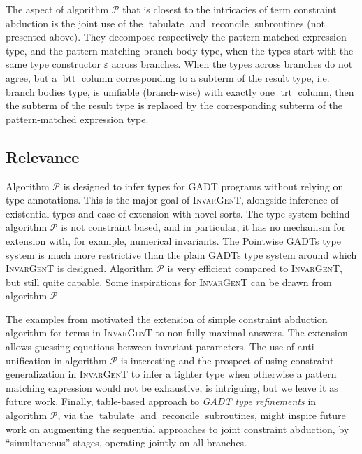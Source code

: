 \documentclass{article}
\newcommand{\tmem}[1]{{\em #1\/}}
\newcommand{\tmname}[1]{\textsc{#1}}
\newcommand{\tmop}[1]{\ensuremath{\operatorname{#1}}}
\begin{document}
The aspect of algorithm $\mathcal{P}$ that is closest to the intricacies of
term constraint abduction is the joint use of the $\tmop{tabulate}$ and
$\tmop{reconcile}$ subroutines (not presented above). They decompose
respectively the pattern-matched expression type, and the pattern-matching
branch body type, when the types start with the same type constructor
$\varepsilon$ across branches. When the types across branches do not agree,
but a $\tmop{btt}$ column corresponding to a subterm of the result type, i.e.
branch bodies type, is unifiable (branch-wise) with exactly one $\tmop{trt}$
column, then the subterm of the result type is replaced by the corresponding
subterm of the pattern-matched expression type.

\subsection{Relevance}

Algorithm $\mathcal{P}$ is designed to infer types for GADT programs without
relying on type annotations. This is the major goal of {\tmname{InvarGenT}},
alongside inference of existential types and ease of extension with novel
sorts. The type system behind algorithm $\mathcal{P}$ is not constraint based,
and in particular, it has no mechanism for extension with, for example,
numerical invariants. The Pointwise GADTs type system is much more restrictive
than the plain GADTs type system around which {\tmname{InvarGenT}} is
designed. Algorithm $\mathcal{P}$ is very efficient compared to
{\tmname{InvarGenT}}, but still quite capable. Some inspirations for
{\tmname{InvarGenT}} can be drawn from algorithm $\mathcal{P}$.

The examples from {\cite{PracticalGADTsInfer}} motivated the extension of
simple constraint abduction algorithm for terms in {\tmname{InvarGenT}} to
non-fully-maximal answers. The extension allows guessing equations between
invariant parameters. The use of anti-unification in algorithm $\mathcal{P}$
is interesting and the prospect of using constraint generalization in
{\tmname{InvarGenT}} to infer a tighter type when otherwise a pattern matching
expression would not be exhaustive, is intriguing, but we leave it as future
work. Finally, table-based approach to {\tmem{GADT type refinements}} in
algorithm $\mathcal{P}$, via the $\tmop{tabulate}$ and $\tmop{reconcile}$
subroutines, might inspire future work on augmenting the sequential approaches
to joint constraint abduction, by ``simultaneous'' stages, operating jointly
on all branches.
\end{document}
